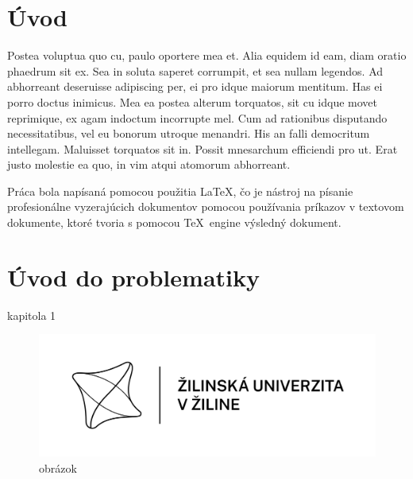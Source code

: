 \documentclass[12pt]{article}
\begin{document}


\newpage %
\thispagestyle{empty}
\tableofcontents
\newpage
\thispagestyle{empty}
\listoffigures
\newpage
\thispagestyle{empty}
\listoftables


\newpage
{}
\setcounter{page}{10} %
\section*{Úvod} %
\hspace{1.25cm}Postea voluptua quo cu, paulo oportere mea et. Alia equidem id eam, diam oratio phaedrum sit ex. Sea in soluta saperet corrumpit, et sea nullam legendos. Ad abhorreant deseruisse adipiscing per, ei pro idque maiorum mentitum. Has ei porro doctus inimicus. Mea ea postea alterum torquatos, sit cu idque movet reprimique, ex agam indoctum incorrupte mel.
Cum ad rationibus disputando necessitatibus, vel eu bonorum utroque menandri. His an falli democritum intellegam. Maluisset torquatos sit in. Possit mnesarchum efficiendi pro ut. Erat justo molestie ea quo, in vim atqui atomorum abhorreant.~\cite{modernrob}

Práca bola napísaná pomocou použitia \LaTeX, čo je nástroj na písanie profesionálne vyzerajúcich dokumentov pomocou používania príkazov v textovom dokumente, ktoré tvoria s pomocou \TeX \ engine výsledný dokument.

\newpage
\section{Úvod do problematiky}
kapitola 1
\begin{figure}[H] %
\centering
\includegraphics{logo}
\caption{obrázok}
\label{img:obrazok}
\end{figure}
\end{document}

